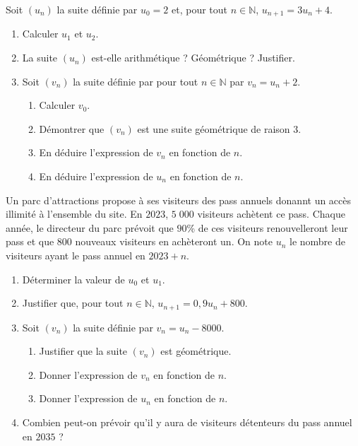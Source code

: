 \documentclass[11pt]{article}
\begin{document}
\begin{exo}
  Soit $(u_n)$ la suite définie par $u_0=2$ et, pour tout $n\in\mathbb{N}$,
  $u_{n+1}=3u_n+4$.
  \begin{enumerate}
    \item Calculer $u_1$ et $u_2$.
    \item La suite $\left( u_n \right)$ est-elle arithmétique ? Géométrique ?
      Justifier.
    \item Soit $\left( v_n \right)$ la suite définie par pour tout
      $n\in\mathbb{N}$ par $v_n=u_n+2$.
      \begin{enumerate}
        \item Calculer $v_0$.
        \item Démontrer que $\left( v_n \right)$ est une suite géométrique de
          raison $3$.
        \item En déduire l'expression de $v_n$ en fonction de $n$.
        \item En déduire l'expression de $u_n$ en fonction de $n$.
      \end{enumerate}
  \end{enumerate}
\end{exo}

\begin{exo}
  Un parc d'attractions propose à ses visiteurs des pass annuels donannt un
  accès illimité à l'ensemble du site. En $2023$, $5\;000$ visiteurs achètent ce
  pass. Chaque année, le directeur du parc prévoit que $90$\% de ces visiteurs
  renouvelleront leur pass et que $800$ nouveaux visiteurs en achèteront un. On
  note $u_n$ le nombre de visiteurs ayant le pass annuel en $2023+n$.
  \begin{enumerate}
    \item Déterminer la valeur de $u_0$ et $u_1$.
    \item Justifier que, pour tout $n\in\mathbb{N}$, $u_{n+1} = 0,9u_n+800$.
    \item Soit $\left( v_n \right)$ la suite définie par $v_n=u_n-8000$.
      \begin{enumerate}
        \item Justifier que la suite $\left( v_n \right)$ est géométrique.
        \item Donner l'expression de $v_n$ en fonction de $n$.
        \item Donner l'expression de $u_n$ en fonction de $n$.
      \end{enumerate}
    \item Combien peut-on prévoir qu'il y aura de visiteurs détenteurs du pass
      annuel en $2035$ ?
  \end{enumerate}
\end{exo}
\end{document}
